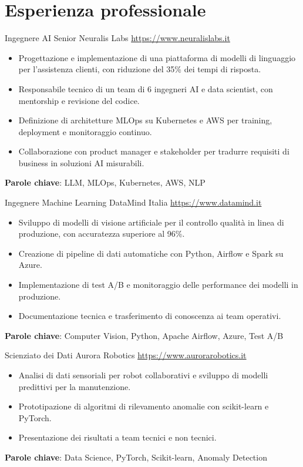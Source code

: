 \documentclass[a4paper, serif, 10pt]{moderncv}
\begin{document}
\section{Esperienza professionale}

        {Ingegnere AI Senior}
        {Neuralis Labs}
        {\url{https://www.neuralislabs.it}}
        {}
        {\begin{itemize}
\item Progettazione e implementazione di una piattaforma di modelli di linguaggio per l'assistenza clienti, con riduzione del 35\% dei tempi di risposta.
\item Responsabile tecnico di un team di 6 ingegneri AI e data scientist, con mentorship e revisione del codice.
\item Definizione di architetture MLOps su Kubernetes e AWS per training, deployment e monitoraggio continuo.
\item Collaborazione con product manager e stakeholder per tradurre requisiti di business in soluzioni AI misurabili.
\end{itemize}
\textbf{Parole chiave}: LLM, MLOps, Kubernetes, AWS, NLP}

        {Ingegnere Machine Learning}
        {DataMind Italia}
        {\url{https://www.datamind.it}}
        {}
        {\begin{itemize}
\item Sviluppo di modelli di visione artificiale per il controllo qualità in linea di produzione, con accuratezza superiore al 96\%.
\item Creazione di pipeline di dati automatiche con Python, Airflow e Spark su Azure.
\item Implementazione di test A/B e monitoraggio delle performance dei modelli in produzione.
\item Documentazione tecnica e trasferimento di conoscenza ai team operativi.
\end{itemize}
\textbf{Parole chiave}: Computer Vision, Python, Apache Airflow, Azure, Test A/B}

        {Scienziato dei Dati}
        {Aurora Robotics}
        {\url{https://www.aurorarobotics.it}}
        {}
        {\begin{itemize}
\item Analisi di dati sensoriali per robot collaborativi e sviluppo di modelli predittivi per la manutenzione.
\item Prototipazione di algoritmi di rilevamento anomalie con scikit-learn e PyTorch.
\item Presentazione dei risultati a team tecnici e non tecnici.
\end{itemize}
\textbf{Parole chiave}: Data Science, PyTorch, Scikit-learn, Anomaly Detection}
\end{document}

